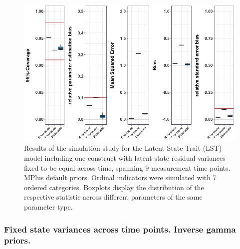  \begin{figure}[H]
 \begin{adjustwidth}{-1cm}{-1cm}
    \begin{center}
  \includegraphics[width=1\textwidth]{Boxplot_LST_fixed.png}
   \end{center}
    \end{adjustwidth}
      \captionsetup{skip=10pt,width=1.05\textwidth}
\caption[Results LST fixed variance]{Results of the simulation study for the Latent State Trait (LST) model including one construct with latent state residual variances fixed to be equal across time, spanning 9 measurement time points. MPlus default priors. Ordinal indicators were simulated with 7 ordered categories. Boxplots display the distribution of the respective statistic across different parameters of the same parameter type.}
\label{Fig: LST one fixed}
\end{figure}


  \subsubsection{Fixed state variances across time points. Inverse gamma priors.}

